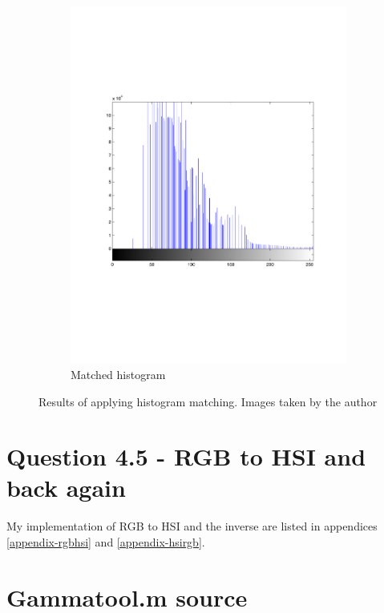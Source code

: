 \documentclass[a4paper]{article}
\begin{document}
\begin{figure}[ht]
\begin{subfigure}[b]{0.3\textwidth}
                \includegraphics[width=\textwidth]{q4-c-thist}
                \caption{Matched histogram}
                \label{fig:ahe2}
        \end{subfigure}
        \caption{Results of applying histogram matching. Images taken by the author}
        \label{fig:442compare}
\end{figure}

\section*{Question 4.5 - RGB to HSI and back again} 

My implementation of RGB to HSI and the inverse are listed in appendices \ref{appendix-rgbhsi} and \ref{appendix-hsirgb}.


\clearpage
\appendix 
\section{Gammatool.m source} 
\label{appendix-gammatool} 

\end{document}
